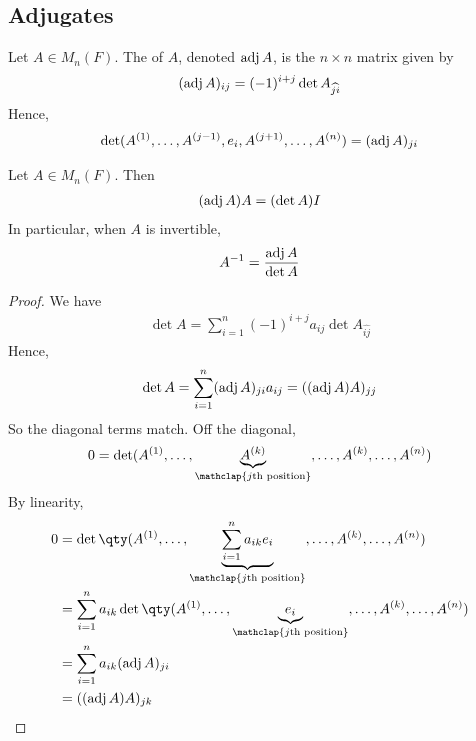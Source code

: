 \subsection{Adjugates}
\begin{definition}
	Let $A \in M_n(F)$.
	The  of $A$, denoted $\operatorname{adj} A$, is the $n \times n$ matrix given by
	\begin{align*}
		(\operatorname{adj} A)_{ij} = (-1)^{i+j} \det A_{\widehat{ji}}
	\end{align*}
	Hence,
	\begin{align*}
		\det (A^{(1)}, \dots, A^{(j-1)}, e_i, A^{(j+1)}, \dots, A^{(n)}) = (\operatorname{adj} A)_{ji}
	\end{align*}
\end{definition}

\begin{theorem}
	Let $A \in M_n(F)$.
	Then
	\begin{align*}
		(\operatorname{adj} A) A = (\det A) I
	\end{align*}
	In particular, when $A$ is invertible,
	\begin{align*}
		A^{-1} = \frac{\operatorname{adj} A}{\det A}
	\end{align*}
\end{theorem}

\begin{proof}
	We have
	\begin{align*}
		\det A = \sum_{i=1}^n (-1)^{i+j} a_{ij} \det A_{\widehat{ij}}
	\end{align*}
	Hence,
	\begin{align*}
		\det A = \sum_{i=1}^n (\operatorname{adj} A)_{ji} a_{ij} = ((\operatorname{adj} A) A)_{jj}
	\end{align*}
	So the diagonal terms match.
	Off the diagonal,
	\begin{align*}
		0 = \det(A^{(1)}, \dots, \underbrace{A^{(k)}}_{\mathclap{j\text{th position}}}, \dots, A^{(k)}, \dots, A^{(n)})
	\end{align*}
	By linearity,
	\begin{align*}
		0 &= \det\qty(A^{(1)}, \dots, \underbrace{\sum_{i=1}^n a_{ik} e_i}_{\mathclap{j\text{th position}}}, \dots, A^{(k)}, \dots, A^{(n)}) \\
		&= \sum_{i=1}^n a_{ik} \det\qty(A^{(1)}, \dots, \underbrace{e_i}_{\mathclap{j\text{th position}}}, \dots, A^{(k)}, \dots, A^{(n)}) \\
		&= \sum_{i=1}^n a_{ik} (\adj A)_{ji} \\
		&= ((\adj A) A)_{jk}
	\end{align*}
\end{proof}

